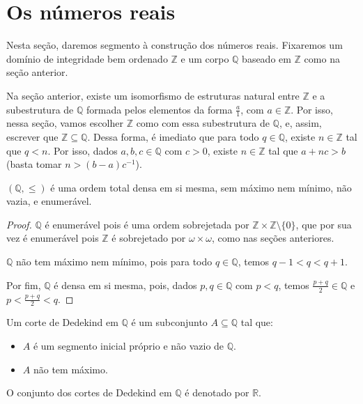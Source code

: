 \section{Os números reais}

Nesta seção, daremos segmento à construção dos números reais.
Fixaremos um domínio de integridade bem ordenado $\mathbb Z$ e um corpo $\mathbb Q$ baseado em $\mathbb Z$ como na seção anterior.

Na seção anterior, existe um isomorfismo de estruturas natural entre $\mathbb Z$ e a subestrutura de $\mathbb Q$ formada pelos elementos da forma $\frac{a}{1}$, com $a\in\mathbb Z$.
Por isso, nessa seção, vamos escolher $\mathbb Z$ como com essa subestrutura de $\mathbb Q$, e, assim, escrever que $\mathbb Z\subseteq \mathbb Q$.
Dessa forma, é imediato que para todo $q \in \mathbb Q$, existe $n\in \mathbb Z$ tal que $q<n$.
Por isso, dados $a, b, c \in \mathbb Q$ com $c>0$, existe $n\in \mathbb Z$ tal que $a+nc>b$ (basta tomar $n>(b-a)c^{-1}$).

\begin{lemma}
    $(\mathbb Q, \leq)$ é uma ordem total densa em si mesma, sem máximo nem mínimo, não vazia, e enumerável.
\end{lemma}
\begin{proof}
    $\mathbb Q$ é enumerável pois é uma ordem sobrejetada por $\mathbb Z\times\mathbb Z\setminus\{0\}$, que por sua vez é enumerável pois $\mathbb Z$ é sobrejetado por $\omega\times \omega$, como nas seções anteriores.

    $\mathbb Q$ não tem máximo nem mínimo, pois para todo $q\in\mathbb Q$, temos $q-1<q<q+1$.

    Por fim, $\mathbb Q$ é densa em si mesma, pois, dados $p,q\in\mathbb Q$ com $p<q$, temos $\frac{p+q}{2}\in\mathbb Q$ e $p<\frac{p+q}{2}<q$.
\end{proof}

\begin{definition}
    Um corte de Dedekind em $\mathbb Q$ é um subconjunto $A\subseteq \mathbb Q$ tal que:
    \begin{itemize}
        \item $A$ é um segmento inicial próprio e não vazio de $\mathbb Q$.
        \item $A$ não tem máximo.
    \end{itemize}
    O conjunto dos cortes de Dedekind em $\mathbb Q$ é denotado por $\mathbb R$.
\end{definition}

